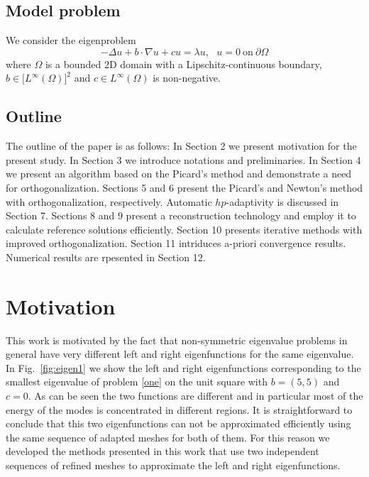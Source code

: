 \documentclass[smallextended]{svjour3}
\begin{document}
\subsection{Model problem}

We consider the eigenproblem
\begin{equation} \label{one}
-\Delta u + b\cdot\nabla u + cu = \lambda u, \ \ \ u = 0 \ \mbox{on} \ \partial \Omega
\end{equation}
where $\Omega$ is a bounded 2D domain with a Lipschitz-continuous boundary,
$b \in \big[L^\infty(\Omega)\big]^2$ and $c\in L^\infty(\Omega)$ is non-negative.


\subsection{Outline}

The outline of the paper is as follows: In Section 2 we present motivation 
for the present study. In Section 3 we introduce notations and preliminaries. 
In Section 4 we present an algorithm based on the Picard's method and demonstrate 
a need for orthogonalization. Sections 5 and 6 present the Picard's and Newton's
method with orthogonalization, respectively. Automatic $hp$-adaptivity is discussed in 
Section 7. Sections 8 and 9 present a reconstruction technology and employ it to 
calculate reference solutions efficiently. Section 10 presents iterative methods 
with improved orthogonalization. Section 11 intriduces a-priori convergence results. 
Numerical results are rpesented in Section 12.



\section{Motivation}\label{sec:motiv}

This work is motivated by the fact that non-symmetric eigenvalue problems in general have very different left and right eigenfunctions for the same eigenvalue.
In Fig.~\ref{fig:eigen1} we show the left and right eigenfunctions corresponding to the smallest eigenvalue of problem \eqref{one} on the unit square with $b = (5, 5)$ and $c=0$. 
As can be seen the two functions are different and in particular most of the energy of the modes is concentrated in different regions. It is straightforward to conclude that this two eigenfunctions can not be approximated efficiently using the same sequence of adapted meshes for both of them. For this reason we developed the methods presented in this work that use two independent sequences of refined meshes to approximate the left and right eigenfunctions.
\end{document}
